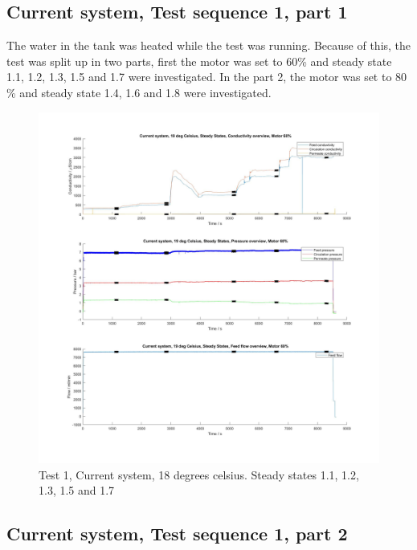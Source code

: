 \newpage
\subsection{Current system, Test sequence 1, part 1}

The water in the tank was heated while the test was running. Because of this, the test was split up in two parts, first the motor was set to 60\% and steady state 1.1, 1.2, 1.3, 1.5 and 1.7 were investigated. In the part 2, the motor was set to 80 \% and steady state 1.4, 1.6 and 1.8 were investigated. 

\begin{figure}[h]
    \centering
    \includegraphics[width=1.1\textwidth]{overview20_60}
    \caption{Test 1, Current system, 18 degrees celsius. Steady states 1.1, 1.2, 1.3, 1.5 and 1.7 }
    \label{fig:PressConn}
\end{figure}

\newpage

\subsection{Current system, Test sequence 1, part 2}
  
